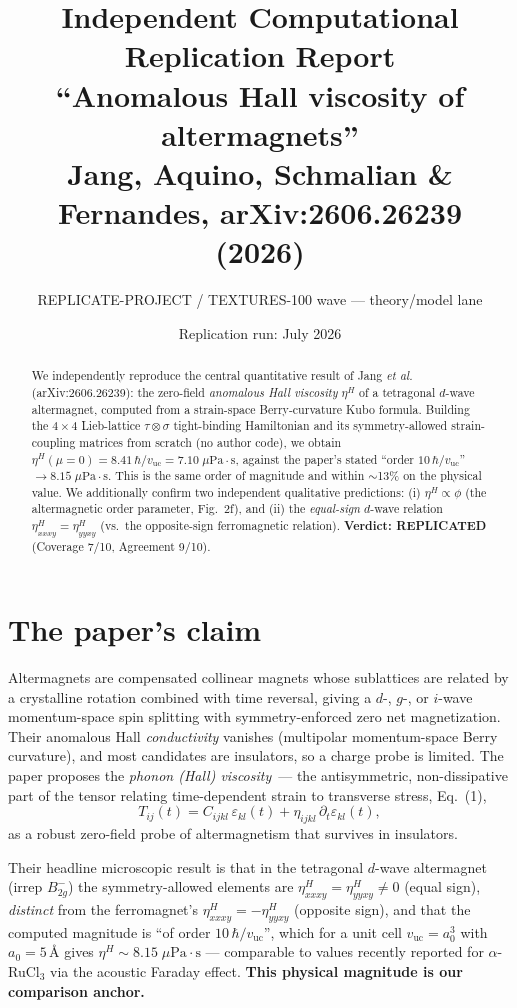 \documentclass[11pt,a4paper]{article}
\title{Independent Computational Replication Report\\[4pt]
\large ``Anomalous Hall viscosity of altermagnets''\\
Jang, Aquino, Schmalian \& Fernandes, arXiv:2606.26239 (2026)}
\author{REPLICATE-PROJECT / TEXTURES-100 wave --- theory/model lane}
\date{Replication run: July 2026}
\newcommand{\vuc}{v_{\mathrm{uc}}}
\newcommand{\etaH}{\eta^{H}}
\begin{document}
\maketitle

\begin{abstract}
We independently reproduce the central quantitative result of Jang \emph{et al.}
(arXiv:2606.26239): the zero-field \emph{anomalous Hall viscosity} $\etaH$ of a
tetragonal $d$-wave altermagnet, computed from a strain-space Berry-curvature
Kubo formula. Building the $4\times4$ Lieb-lattice $\tau\otimes\sigma$ tight-binding
Hamiltonian and its symmetry-allowed strain-coupling matrices from scratch (no
author code), we obtain $\etaH(\mu=0) = 8.41\,\hbar/\vuc = 7.10\;\mu\text{Pa}\cdot\text{s}$,
against the paper's stated ``order $10\,\hbar/\vuc$'' $\to 8.15\;\mu\text{Pa}\cdot\text{s}$.
This is the same order of magnitude and within $\sim$13\% on the physical value.
We additionally confirm two independent qualitative predictions: (i) $\etaH \propto \phi$
(the altermagnetic order parameter, Fig.~2f), and (ii) the \emph{equal-sign}
$d$-wave relation $\eta^{H}_{xxxy} = \eta^{H}_{yyxy}$ (vs.\ the opposite-sign
ferromagnetic relation). \textbf{Verdict: REPLICATED} (Coverage 7/10, Agreement 9/10).
\end{abstract}

\section{The paper's claim}
Altermagnets are compensated collinear magnets whose sublattices are related by a
crystalline rotation combined with time reversal, giving a $d$-, $g$-, or $i$-wave
momentum-space spin splitting with symmetry-enforced zero net magnetization. Their
anomalous Hall \emph{conductivity} vanishes (multipolar momentum-space Berry
curvature), and most candidates are insulators, so a charge probe is limited. The
paper proposes the \emph{phonon (Hall) viscosity}~--- the antisymmetric,
non-dissipative part of the tensor relating time-dependent strain to transverse
stress, Eq.~(1),
\begin{equation}
T_{ij}(t) = C_{ijkl}\,\varepsilon_{kl}(t) + \eta_{ijkl}\,\partial_t \varepsilon_{kl}(t),
\end{equation}
as a robust zero-field probe of altermagnetism that survives in insulators.

Their headline microscopic result is that in the tetragonal $d$-wave altermagnet
(irrep $B_{2g}^{-}$) the symmetry-allowed elements are
$\eta^{H}_{xxxy}=\eta^{H}_{yyxy}\neq 0$ (equal sign), \emph{distinct} from the
ferromagnet's $\eta^{H}_{xxxy}=-\eta^{H}_{yyxy}$ (opposite sign), and that the
computed magnitude is ``of order $10\,\hbar/\vuc$'', which for a unit cell
$\vuc=a_0^3$ with $a_0=5\,\text{\AA}$ gives $\etaH \sim 8.15\;\mu\text{Pa}\cdot\text{s}$
--- comparable to values recently reported for $\alpha$-RuCl$_3$ via the acoustic
Faraday effect. \textbf{This physical magnitude is our comparison anchor.}
\end{document}
